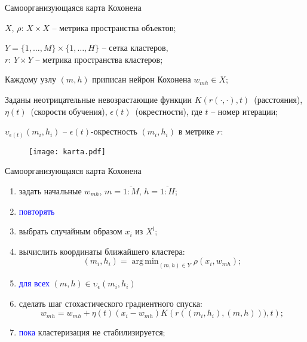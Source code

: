 \documentclass[unicode, notheorems, pdf]{beamer}
\DeclareMathOperator*{\argmin}{arg\,\min}
\begin{document}
\begin{frame}{Самоорганизующаяся карта Кохонена}
	
	$X$, $\rho:\,X \times X$ -- метрика пространства объектов;

	\vspace{.25cm}
	$Y=\{1,\dots,M\} \times \{1,\dots,H\}$ -- сетка кластеров,\\
	$r: \, Y \times Y$ -- метрика пространства кластеров;

	\vspace{.25cm}
	Каждому узлу $(m,h)$ приписан нейрон Кохонена $w_{mh}\in X$;

	\vspace{.25cm}
	Заданы неотрицательные невозрастающие функции $K(r(\cdot,\cdot),t)$~(расстояния), $\eta(t)$~(скорости обучения), $\epsilon(t)$~(окрестности), где $t$ -- номер итерации;

	\vspace{.25cm}
	$\upsilon_{\epsilon(t)}(m_i,h_i)$ -- $\epsilon(t)$-окрестность $(m_i,h_i)$ в метрике $r$:

	\begin{figure}
	\texttt{[image: karta.pdf]}
	\end{figure}
\end{frame}

\begin{frame}{Самоорганизующаяся карта Кохонена}
	
	\begin{enumerate}
	\item задать начальные $w_{mh}$, $m=\overline{1:M}$, $h=\overline{1:H}$;

	\item \textcolor{blue}{повторять}

	\item\hspace{.5cm} выбрать случайным образом $x_i$ из $X^l$;

	\item\hspace{.5cm} вычислить координаты ближайшего кластера:
	\[(m_i,h_i)=\argmin_{(m,h)\in Y}\rho(x_i,w_{mh});\]

	\item\hspace{.5cm} \textcolor{blue}{для всех} $(m,h)\in\upsilon_{\epsilon}(m_i,h_i)$

	\item\hspace{1cm} сделать шаг стохастического градиентного спуска:
	\[w_{mh}=w_{mh}+\eta(t)(x_i-w_{mh})K\left(r( (m_i,h_i),(m,h) )), t\right);\]

	\item \textcolor{blue}{пока} кластеризация не стабилизируется;

	\end{enumerate}
\end{frame}
\end{document}

